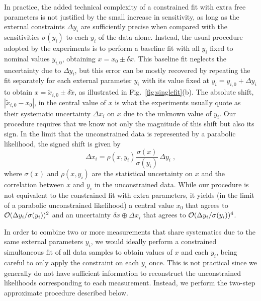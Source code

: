 In practice, the added technical complexity of a constrained fit with
extra free parameters is not justified by the small increase in
sensitivity, as long as the external constraints $\Delta y_i$ are
sufficiently precise when compared with the sensitivities $\sigma(y_i)$
to each $y_i$ of the data alone. Instead, the usual procedure adopted
by the experiments is to perform a baseline fit with all $y_i$ fixed
to nominal values $y_{i,0}$, obtaining $x = x_0 \pm \delta
x$. This baseline fit neglects the uncertainty due to $\Delta y_i$, but
this error can be mostly recovered by repeating the fit separately for
each external parameter $y_i$ with its value fixed at $y_i = y_{i,0} +
\Delta y_i$ to obtain $x = \tilde{x}_{i,0} \pm \delta\tilde{x}$, as
illustrated in Fig.~\ref{fig:singlefit}(b). The absolute shift,
$|\tilde{x}_{i,0} - x_0|$, in the central value of $x$ is what the
experiments usually quote as their systematic uncertainty $\Delta x_i$
on $x$ due to the unknown value of $y_i$. Our procedure requires that
we know not only the magnitude of this shift but also its sign. In the
limit that the unconstrained data is represented by a parabolic
likelihood, the signed shift is given by
\begin{equation}
\Delta x_i = \rho(x,y_i)\frac{\sigma(x)}{\sigma(y_i)}\,\Delta y_i \;,
\end{equation}
where $\sigma(x)$ and $\rho(x,y_i)$ are the statistical uncertainty on
$x$ and the correlation between $x$ and
$y_i$ in the unconstrained data.
While our procedure is not
equivalent to the constrained fit with extra parameters, it yields (in
the limit of a parabolic unconstrained likelihood) a central value
$x_0$ that agrees 
to ${\cal O}(\Delta y_i/\sigma(y_i))^2$ and an uncertainty $\delta x
\oplus \Delta x_i$ that agrees to ${\cal O}(\Delta y_i/\sigma(y_i))^4$.

In order to combine two or more measurements that share systematics
due to the same external parameters $y_i$, we would ideally perform a
constrained simultaneous fit of all data samples to obtain values of
$x$ and each $y_i$, being careful to only apply the constraint on each
$y_i$ once. This is not practical since we generally do not have
sufficient information to reconstruct the unconstrained likelihoods
corresponding to each measurement. Instead, we perform the two-step
approximate procedure described below.

